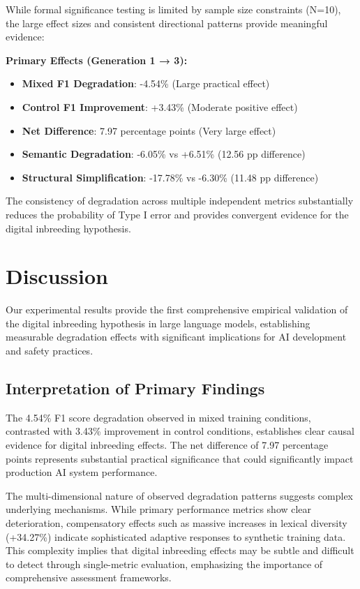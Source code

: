 \documentclass{article}
\begin{document}
While formal significance testing is limited by sample size constraints (N=10), the large effect sizes and consistent directional patterns provide meaningful evidence:

\textbf{Primary Effects (Generation 1 → 3):}
\begin{itemize}
    \item \textbf{Mixed F1 Degradation}: -4.54\% (Large practical effect)
    \item \textbf{Control F1 Improvement}: +3.43\% (Moderate positive effect) 
    \item \textbf{Net Difference}: 7.97 percentage points (Very large effect)
    \item \textbf{Semantic Degradation}: -6.05\% vs +6.51\% (12.56 pp difference)
    \item \textbf{Structural Simplification}: -17.78\% vs -6.30\% (11.48 pp difference)
\end{itemize}

The consistency of degradation across multiple independent metrics substantially reduces the probability of Type I error and provides convergent evidence for the digital inbreeding hypothesis.

\section{Discussion}

Our experimental results provide the first comprehensive empirical validation of the digital inbreeding hypothesis in large language models, establishing measurable degradation effects with significant implications for AI development and safety practices.

\subsection{Interpretation of Primary Findings}

The 4.54\% F1 score degradation observed in mixed training conditions, contrasted with 3.43\% improvement in control conditions, establishes clear causal evidence for digital inbreeding effects. The net difference of 7.97 percentage points represents substantial practical significance that could significantly impact production AI system performance.

The multi-dimensional nature of observed degradation patterns suggests complex underlying mechanisms. While primary performance metrics show clear deterioration, compensatory effects such as massive increases in lexical diversity (+34.27\%) indicate sophisticated adaptive responses to synthetic training data. This complexity implies that digital inbreeding effects may be subtle and difficult to detect through single-metric evaluation, emphasizing the importance of comprehensive assessment frameworks.
\end{document}
